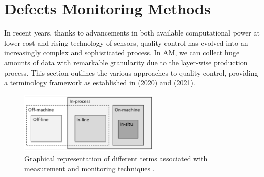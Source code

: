 
\section{Defects Monitoring Methods}
\label{sec:comelotrovo}
In recent years, thanks to advancements in both available computational power at lower cost and rising technology of sensors, quality control has evolved into an increasingly complex and sophisticated process. In AM, we can collect huge amounts of data with remarkable granularity due to the layer-wise production process. This section outlines the various approaches to quality control, providing a terminology framework as established in \citeauthor{richard_leach_integrated_2020} (2020) and \citeauthor{grasso_-situ_2021} (2021).
\begin{figure}
    \centering
    \includegraphics[width=0.6\textwidth]{Images/dovevai.png}
    \caption[Measurement and monitoring techniques.]{Graphical representation of different terms associated with measurement and monitoring techniques \cite{richard_leach_integrated_2020}.}
    \label{fig:dovevai}
\end{figure}
